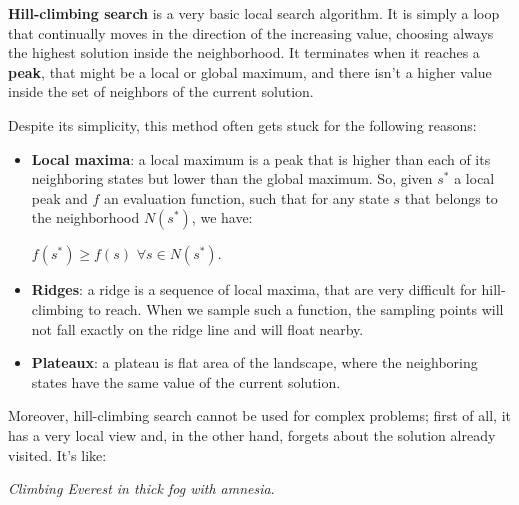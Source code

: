\textbf{Hill-climbing search} is a very basic local search algorithm. It is simply a loop that continually moves in the direction of the increasing value, choosing always
the highest solution inside the neighborhood. It terminates when it reaches a \textbf{peak}, that might be a local or global maximum, and there isn't a higher value 
inside the set of neighbors of the current solution. \vspace{3.5pt}

Despite its simplicity, this method often gets stuck for the following reasons:
\begin{itemize}
    \renewcommand{\labelitemi}{-}
    \item \textbf{Local maxima}: a local maximum is a peak that is higher than each of its neighboring states but lower than the global maximum. So, given $s^*$ a local peak
    and $f$ an evaluation function, such that for any state $s$ that belongs to the neighborhood $N(s^*)$, we have: \vspace{3.5pt}
    \begin{center}
        $f(s^*) \ge f(s)$ $\forall s \in N(s^*)$.
    \end{center}
    \item \textbf{Ridges}: a ridge is a sequence of local maxima, that are very difficult for hill-climbing to reach. When we sample such a function, the sampling points
    will not fall exactly on the ridge line and will float nearby.
    \item \textbf{Plateaux}: a plateau is flat area of the landscape, where the neighboring states have the same value of the current solution.
\end{itemize}

Moreover, hill-climbing search cannot be used for complex problems; first of all, it has a very local view and, in the other hand, forgets about the solution already visited.
It's like: \vspace{3.5pt}
\begin{center}
    \textit{Climbing Everest in thick fog with amnesia}.
\end{center}\vspace{3.5pt}